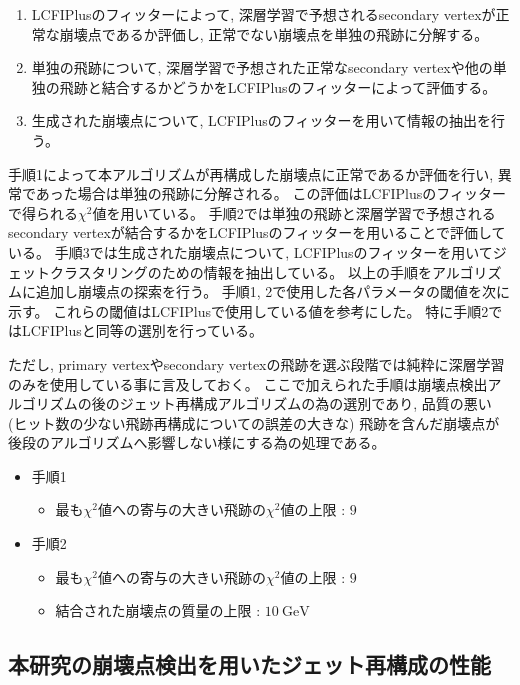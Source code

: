 \begin{enumerate}
 \item LCFIPlusのフィッターによって, 深層学習で予想されるsecondary vertexが正常な崩壊点であるか評価し, 正常でない崩壊点を単独の飛跡に分解する。
 \item 単独の飛跡について, 深層学習で予想された正常なsecondary vertexや他の単独の飛跡と結合するかどうかをLCFIPlusのフィッターによって評価する。
 \item 生成された崩壊点について, LCFIPlusのフィッターを用いて情報の抽出を行う。
\end{enumerate}

手順1によって本アルゴリズムが再構成した崩壊点に正常であるか評価を行い, 異常であった場合は単独の飛跡に分解される。
この評価はLCFIPlusのフィッターで得られる$\chi^2$値を用いている。
手順2では単独の飛跡と深層学習で予想されるsecondary vertexが結合するかをLCFIPlusのフィッターを用いることで評価している。
手順3では生成された崩壊点について, LCFIPlusのフィッターを用いてジェットクラスタリングのための情報を抽出している。
以上の手順をアルゴリズムに追加し崩壊点の探索を行う。
手順1, 2で使用した各パラメータの閾値を次に示す。
これらの閾値はLCFIPlusで使用している値を参考にした。
特に手順2ではLCFIPlusと同等の選別を行っている。

ただし, primary vertexやsecondary vertexの飛跡を選ぶ段階では純粋に深層学習のみを使用している事に言及しておく。
ここで加えられた手順は崩壊点検出アルゴリズムの後のジェット再構成アルゴリズムの為の選別であり, 品質の悪い (ヒット数の少ない飛跡再構成についての誤差の大きな) 飛跡を含んだ崩壊点が後段のアルゴリズムへ影響しない様にする為の処理である。

\begin{itemize}
 \item 手順1
 \begin{itemize}
  \item 最も$\chi^2$値への寄与の大きい飛跡の$\chi^2$値の上限 : $9$
 \end{itemize}
 \item 手順2
 \begin{itemize}
  \item 最も$\chi^2$値への寄与の大きい飛跡の$\chi^2$値の上限 : $9$
  \item 結合された崩壊点の質量の上限 : $10\ \mathrm{GeV}$
 \end{itemize}
\end{itemize}


\subsection{本研究の崩壊点検出を用いたジェット再構成の性能} \label{Com:FlaTagCom:PerformanceofFlavorTagging}


